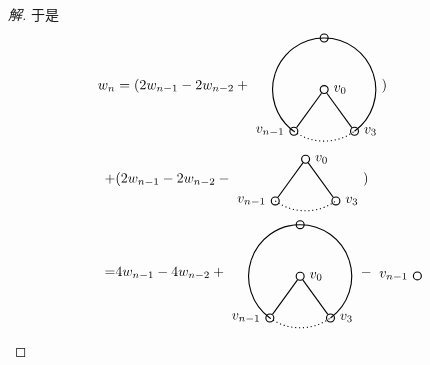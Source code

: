 \documentclass{article}
\begin{document}
\begin{CJK}{UTF8}{gbsn}
\begin{proof}[解]
于是
\begin{align*}
  w_n&=(2w_{n-1} - 2w_{n-2} +
\begin{tikzpicture}[auto,baseline={(current bounding box.center)},
    specification/.style ={circle, draw, thick, inner sep = 0pt, minimum size=2mm}]
   \node[specification] (B)   at (90:1.3cm)  {};
   \node[specification] (D) [label=180:$v_{n-1}$] at (234:1.3cm)  {};
   \node[specification] (E)  [label=0:$v_3$] at (306:1.3cm)  {};
   \node[specification] (o)  [label=0:$v_0$] at (0,0)  {};
   \draw[thick] (D) to  (o);
   \draw[thick] (E) to  (o);
   \draw[thick] (18:1.3cm) arc (18:90:1.3cm);
   \draw[thick] (90:1.3cm) arc (90:162:1.3cm);
   \draw[thick] (162:1.3cm) arc (162:234:1.3cm);
   \draw[thick,dotted] (234:1.3cm) arc (234:306:1.3cm);
   \draw[thick] (306:1.3cm) arc (-54:18:1.3cm);
 \end{tikzpicture})\\
  +&(2w_{n-1} - 2w_{n-2} -
  \begin{tikzpicture}[auto,baseline={(current bounding box.center)},
    specification/.style ={circle, draw, thick, inner sep = 0pt, minimum size=2mm}]
   \node[specification] (D) [label=180:$v_{n-1}$] at (234:1.3cm)  {};
   \node[specification] (E)  [label=0:$v_3$] at (306:1.3cm)  {};
   \node[specification] (o)  [label=0:$v_0$] at (0,0)  {};
   \draw[thick] (E) to  (o);
   \draw[thick] (D) to  (o);
   \draw[thick,dotted] (234:1.3cm) arc (234:306:1.3cm);
 \end{tikzpicture})\\
  =&4w_{n-1} - 4w_{n-2} + \begin{tikzpicture}[auto,baseline={(current bounding box.center)},
    specification/.style ={circle, draw, thick, inner sep = 0pt, minimum size=2mm}]
   \node[specification] (B)   at (90:1.3cm)  {};
   \node[specification] (D) [label=180:$v_{n-1}$] at (234:1.3cm)  {};
   \node[specification] (E)  [label=0:$v_3$] at (306:1.3cm)  {};
   \node[specification] (o)  [label=0:$v_0$] at (0,0)  {};
   \draw[thick] (D) to  (o);
   \draw[thick] (E) to  (o);
   \draw[thick] (18:1.3cm) arc (18:90:1.3cm);
   \draw[thick] (90:1.3cm) arc (90:162:1.3cm);
   \draw[thick] (162:1.3cm) arc (162:234:1.3cm);
   \draw[thick,dotted] (234:1.3cm) arc (234:306:1.3cm);
   \draw[thick] (306:1.3cm) arc (-54:18:1.3cm);
 \end{tikzpicture}-
  \begin{tikzpicture}[auto,baseline={(current bounding box.center)},
    specification/.style ={circle, draw, thick, inner sep = 0pt, minimum size=2mm}]
   \node[specification] (D) [label=180:$v_{n-1}$] at (234:1.3cm)  {};

\end{tikzpicture}
\end{align*}
\end{proof}
\end{CJK}
\end{document}
